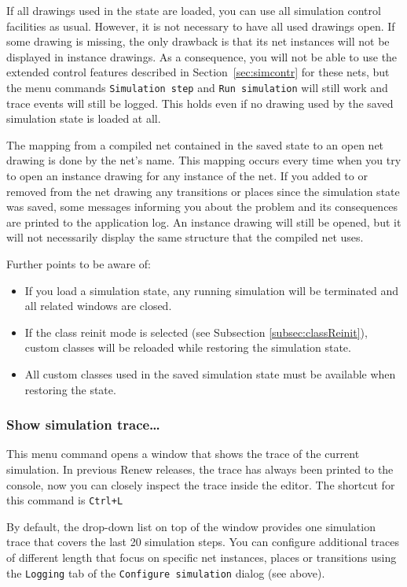 If all drawings used in the state are loaded, you can use
all simulation control facilities as usual.
However, it is not necessary to have all used drawings open.
If some drawing is missing, the only drawback is that its
net instances will not be displayed in instance drawings.
As a consequence, you will not be able to use the extended
control features described in Section~\ref{sec:simcontr}
for these nets, but the menu commands \texttt{Simulation step}
and \texttt{Run simulation} will still work and
trace events will still be logged.
This holds even if no drawing used by the saved simulation
state is loaded at all.

The mapping from a compiled net contained in the saved state
to an open net drawing is done by the net's name.
This mapping occurs every time when you try to open an
instance drawing for any instance of the net.
If you added to or removed from the net drawing
any transitions or places since the simulation state was
saved, some messages informing you about the problem and
its consequences are printed to the application log.
An instance drawing will still be opened, but it will not
necessarily display the same structure that the compiled net
uses.

Further points to be aware of:
\begin{itemize}
\item If you load a simulation state, any running simulation
      will be terminated and all related windows are closed.
\item If the class reinit mode is selected (see Subsection
      \ref{subsec:classReinit}), custom classes will be
      reloaded while restoring the simulation state.
\item All custom classes used in the saved simulation state
      must be available when restoring the state.
\end{itemize}


\subsubsection{Show simulation trace\dots}
\label{subsec:loggingPlugin}
This menu command opens a window that shows the trace of the
current simulation.
In previous Renew releases, the trace has always been printed to the
console, now you can closely inspect the trace inside the editor.
The shortcut for this command is \texttt{Ctrl+L}

By default, the drop-down list on top of the window provides one simulation
trace that covers the last 20 simulation steps.
You can configure additional traces of different length that focus on
specific net instances, places or transitions using the \texttt{Logging}
tab of the \texttt{Configure simulation} dialog (see above).

